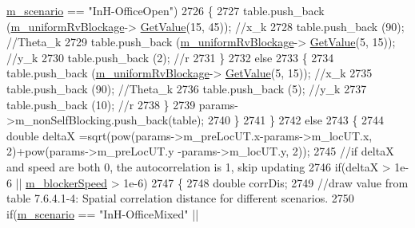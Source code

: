 \begin{DoxyCode}
      \hyperlink{classns3_1_1MmWave3gppChannel_ae1f263fbc87682905d563221343e4447}{m\_scenario} == \textcolor{stringliteral}{"InH-OfficeOpen"})
2726                         \{
2727                                 table.push\_back (\hyperlink{classns3_1_1MmWave3gppChannel_a5afa026ce58c8b70c81c846bb7b49b4f}{m\_uniformRvBlockage}->
      \hyperlink{classns3_1_1UniformRandomVariable_a03822d8c86ac51e9aa83bbc73041386b}{GetValue}(15, 45)); \textcolor{comment}{//x\_k}
2728                                 table.push\_back (90); \textcolor{comment}{//Theta\_k}
2729                                 table.push\_back (\hyperlink{classns3_1_1MmWave3gppChannel_a5afa026ce58c8b70c81c846bb7b49b4f}{m\_uniformRvBlockage}->
      \hyperlink{classns3_1_1UniformRandomVariable_a03822d8c86ac51e9aa83bbc73041386b}{GetValue}(5, 15)); \textcolor{comment}{//y\_k}
2730                                 table.push\_back (2); \textcolor{comment}{//r}
2731                         \}
2732                         \textcolor{keywordflow}{else}
2733                         \{
2734                                 table.push\_back (\hyperlink{classns3_1_1MmWave3gppChannel_a5afa026ce58c8b70c81c846bb7b49b4f}{m\_uniformRvBlockage}->
      \hyperlink{classns3_1_1UniformRandomVariable_a03822d8c86ac51e9aa83bbc73041386b}{GetValue}(5, 15)); \textcolor{comment}{//x\_k}
2735                                 table.push\_back (90); \textcolor{comment}{//Theta\_k}
2736                                 table.push\_back (5); \textcolor{comment}{//y\_k}
2737                                 table.push\_back (10); \textcolor{comment}{//r}
2738                         \}
2739                         params->m\_nonSelfBlocking.push\_back(table);
2740                 \}
2741         \}
2742         \textcolor{keywordflow}{else}
2743         \{
2744                 \textcolor{keywordtype}{double} deltaX =sqrt(pow(params->m\_preLocUT.x-params->m\_locUT.x, 2)+pow(params->m\_preLocUT.y
      -params->m\_locUT.y, 2));
2745                 \textcolor{comment}{//if deltaX and speed are both 0, the autocorrelation is 1, skip updating}
2746                 \textcolor{keywordflow}{if}(deltaX > 1e-6 || \hyperlink{classns3_1_1MmWave3gppChannel_a5d7b7b759283cdf9a6781571e9eeca25}{m\_blockerSpeed} > 1e-6)
2747                 \{
2748                         \textcolor{keywordtype}{double} corrDis;
2749                         \textcolor{comment}{//draw value from table 7.6.4.1-4: Spatial correlation distance for different
       scenarios.}
2750                         \textcolor{keywordflow}{if}(\hyperlink{classns3_1_1MmWave3gppChannel_ae1f263fbc87682905d563221343e4447}{m\_scenario} == \textcolor{stringliteral}{"InH-OfficeMixed"} || 

\end{DoxyCode}
